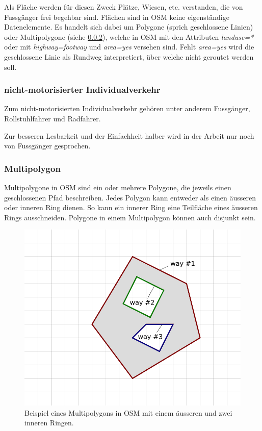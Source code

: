 Als Fläche werden für diesen Zweck Plätze, Wiesen, etc. verstanden, die von Fussgänger frei begehbar sind. Flächen sind in \ac{OSM} keine eigenständige Datenelemente. Es handelt sich dabei um Polygone (sprich geschlossene Linien) oder Multipolygone (siehe \ref{Multipolygon}), welche in \ac{OSM} mit den Attributen \textit{landuse=*} oder mit \textit{highway=footway} und \textit{area=yes} versehen sind. Fehlt \textit{area=yes} wird die geschlossene Linie als Rundweg interpretiert, über welche nicht geroutet werden soll. \cite{osm_wiki_area}

\subsubsection{nicht-motorisierter Individualverkehr}
\label{nicht-motorisierter Individualverkehr}

Zum nicht-motorisierten Individualverkehr gehören unter anderem Fussgänger, Rollstuhlfahrer und Radfahrer.

Zur besseren Lesbarkeit und der Einfachheit halber wird in der Arbeit nur noch von Fussgänger gesprochen.

\subsubsection{Multipolygon}
\label{Multipolygon}

Multipolygone in \ac{OSM} sind ein oder mehrere Polygone, die jeweils einen geschlossenen Pfad beschreiben. Jedes Polygon kann entweder als einen äusseren oder inneren Ring dienen. So kann ein innerer Ring eine Teilfläche eines äusseren Rings ausschneiden. Polygone in einem Multipolygon können auch disjunkt sein. \cite{osm_wiki_multipolygon}

\begin{figure}[th]
\centering
\includegraphics[width=0.5\linewidth]{technicalreport/img/multipolygon_osm_example.png}
\caption[Multipolygon OSM Example]{Beispiel eines Multipolygons in \ac{OSM} mit einem äusseren und zwei inneren Ringen. \cite{osm_wiki_multipolygon}}
\label{fig:multipolygon_osm_example}
\end{figure}

